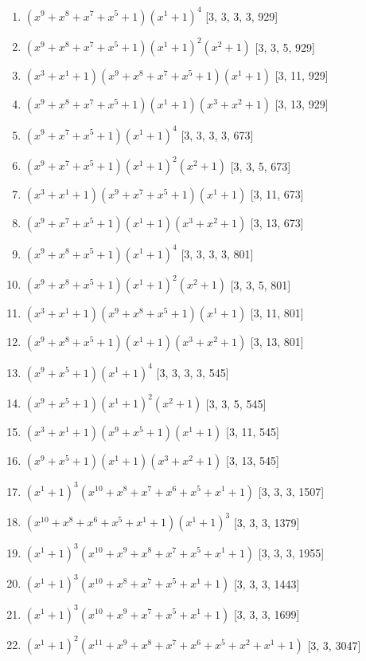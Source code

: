 \documentclass[10pt,twocolumn]{article}
\begin{document}
\begin{enumerate}
\item $(x^{9} + x^{8} + x^{7} + x^{5} + 1)(x^{1} + 1)^{4}$  [3, 3, 3, 3, 929]
\item $(x^{9} + x^{8} + x^{7} + x^{5} + 1)(x^{1} + 1)^{2}(x^{2} + 1)$  [3, 3, 5, 929]
\item $(x^{3} + x^{1} + 1)(x^{9} + x^{8} + x^{7} + x^{5} + 1)(x^{1} + 1)$  [3, 11, 929]
\item $(x^{9} + x^{8} + x^{7} + x^{5} + 1)(x^{1} + 1)(x^{3} + x^{2} + 1)$  [3, 13, 929]
\item $(x^{9} + x^{7} + x^{5} + 1)(x^{1} + 1)^{4}$  [3, 3, 3, 3, 673]
\item $(x^{9} + x^{7} + x^{5} + 1)(x^{1} + 1)^{2}(x^{2} + 1)$  [3, 3, 5, 673]
\item $(x^{3} + x^{1} + 1)(x^{9} + x^{7} + x^{5} + 1)(x^{1} + 1)$  [3, 11, 673]
\item $(x^{9} + x^{7} + x^{5} + 1)(x^{1} + 1)(x^{3} + x^{2} + 1)$  [3, 13, 673]
\item $(x^{9} + x^{8} + x^{5} + 1)(x^{1} + 1)^{4}$  [3, 3, 3, 3, 801]
\item $(x^{9} + x^{8} + x^{5} + 1)(x^{1} + 1)^{2}(x^{2} + 1)$  [3, 3, 5, 801]
\item $(x^{3} + x^{1} + 1)(x^{9} + x^{8} + x^{5} + 1)(x^{1} + 1)$  [3, 11, 801]
\item $(x^{9} + x^{8} + x^{5} + 1)(x^{1} + 1)(x^{3} + x^{2} + 1)$  [3, 13, 801]
\item $(x^{9} + x^{5} + 1)(x^{1} + 1)^{4}$  [3, 3, 3, 3, 545]
\item $(x^{9} + x^{5} + 1)(x^{1} + 1)^{2}(x^{2} + 1)$  [3, 3, 5, 545]
\item $(x^{3} + x^{1} + 1)(x^{9} + x^{5} + 1)(x^{1} + 1)$  [3, 11, 545]
\item $(x^{9} + x^{5} + 1)(x^{1} + 1)(x^{3} + x^{2} + 1)$  [3, 13, 545]
\item $(x^{1} + 1)^{3}(x^{10} + x^{8} + x^{7} + x^{6} + x^{5} + x^{1} + 1)$  [3, 3, 3, 1507]
\item $(x^{10} + x^{8} + x^{6} + x^{5} + x^{1} + 1)(x^{1} + 1)^{3}$  [3, 3, 3, 1379]
\item $(x^{1} + 1)^{3}(x^{10} + x^{9} + x^{8} + x^{7} + x^{5} + x^{1} + 1)$  [3, 3, 3, 1955]
\item $(x^{1} + 1)^{3}(x^{10} + x^{8} + x^{7} + x^{5} + x^{1} + 1)$  [3, 3, 3, 1443]
\item $(x^{1} + 1)^{3}(x^{10} + x^{9} + x^{7} + x^{5} + x^{1} + 1)$  [3, 3, 3, 1699]
\item $(x^{1} + 1)^{2}(x^{11} + x^{9} + x^{8} + x^{7} + x^{6} + x^{5} + x^{2} + x^{1} + 1)$  [3, 3, 3047]

\end{enumerate}
\end{document}
